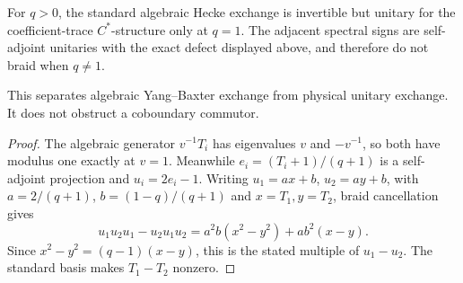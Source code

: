 \begin{theorem}
{\normalfont\statusProved}\quad For $q>0$, the standard algebraic Hecke
exchange is invertible but unitary for the coefficient-trace $C^*$-structure
only at $q=1$.  The adjacent spectral signs are self-adjoint unitaries with
the exact defect displayed above, and therefore do not braid when $q\ne1$.
\end{theorem}
\begin{scope}
This separates algebraic Yang--Baxter exchange from physical unitary
exchange.  It does not obstruct a coboundary commutor.
\end{scope}
\begin{proof}
The algebraic generator $v^{-1}T_i$ has eigenvalues $v$ and $-v^{-1}$,
so both have modulus one exactly at $v=1$.  Meanwhile
$e_i=(T_i+1)/(q+1)$ is a self-adjoint projection and $u_i=2e_i-1$.
Writing $u_1=ax+b$, $u_2=ay+b$, with
$a=2/(q+1)$, $b=(1-q)/(q+1)$ and $x=T_1,y=T_2$, braid cancellation gives
\[
 u_1u_2u_1-u_2u_1u_2=a^2b(x^2-y^2)+ab^2(x-y).
\]
Since $x^2-y^2=(q-1)(x-y)$, this is the stated multiple of $u_1-u_2$.
The standard basis makes $T_1-T_2$ nonzero.
\end{proof}

